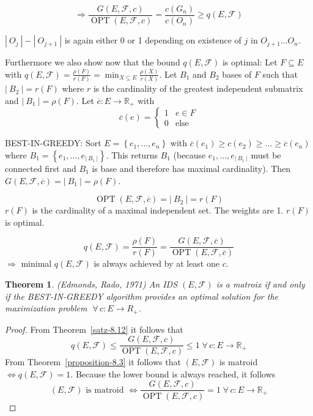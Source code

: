 \documentclass{article}
\newtheorem{theorem}{Theorem}
\newcommand{\card}[1]{\left|\:\!#1\:\!\right|}
\newcommand{\set}[1]{\left\{#1\right\}}
\newcommand{\fall}{\;\forall\,}
\begin{document}
\[
  \Rightarrow
  \frac{G(E, \mathcal{F}, c)}{\operatorname{OPT}(E, \mathcal{F}, c)}
  = \frac{c(G_n)}{c(O_n)}
  \geq q(E, \mathcal{F})
\]

$\card{O_j} - \card{O_{j+1}}$ is again either 0 or 1 depending on existence of $j$ in $O_{j+1} \ldots O_n$.

Furthermore we also show now that the bound $q(E, \mathcal{F})$ is optimal:
Let $F \subseteq E$ with $q(E, \mathcal{F}) = \frac{\rho(F)}{r(F)} = \min_{X \subseteq E} \frac{\rho(X)}{r(X)}$.
Let $B_1$ and $B_2$ bases of $F$ such that $\card{B_2} = r(F)$ where $r$ is the cardinality of the greatest independent submatrix and $\card{B_1} = \rho(F)$.
Let $\overline{c}: E \rightarrow \mathbb{R}_+$ with
\[
  \overline{c}(e) = \begin{cases}
    1 & e \in F \\
    0 & \text{else}
  \end{cases}
\]

BEST-IN-GREEDY: Sort $E = \set{e_1, \ldots, e_n}$ with $\overline{c}(e_1) \geq c(e_2) \geq \ldots \geq \overline{c}(e_n)$ where $B_1 = \set{e_1, \ldots, e_{\card{B_1}}}$. This returns $B_1$ (because $e_1, \ldots, e_{\card{B_1}}$ must be connected first and $B_1$ is base and therefore has maximal cardinality). Then $G(E, \mathcal{F}, \overline{c}) = \card{B_1} = \rho(F)$.

\[ \operatorname{OPT}(E, \mathcal{F}, \overline{c}) = \card{B_2} = r(F) \]
$r(F)$ is the cardinality of a maximal independent set. The weights are 1. $r(F)$ is optimal.

\[ q(E, \mathcal{F}) = \frac{\rho(F)}{r(F)} = \frac{G(E, \mathcal{F}, \overline{c})}{\operatorname{OPT}(E, \mathcal{F}, \overline{c})} \]
$\Rightarrow$ minimal $q(E, \mathcal{F})$ is always achieved by at least one $c$.

\begin{theorem}
  \label{satz-8.13}
  (Edmonds, Rado, 1971)
  An IDS $(E, \mathcal{F})$ is a matroix if and only if the BEST-IN-GREEDY algorithm provides an optimal solution for the maximization problem $\fall c: E \rightarrow{R}_+$.
\end{theorem}

\begin{proof}
  From Theorem~\ref{satz-8.12} it follows that
  \[
      q(E, \mathcal{F})
        \leq \frac{G(E, \mathcal{F}, c)}{\operatorname{OPT}(E, \mathcal{F}, c)}
        \leq 1  \fall c: E \rightarrow \mathbb{R}_+
  \]
  From Theorem~\ref{proposition-8.3} it follows that $(E, \mathcal{F})$ is matroid $\Leftrightarrow q(E, \mathcal{F}) = 1$. Because the lower bound is always reached, it follows
  \[
    (E, \mathcal{F}) \text{ is matroid }
      \Leftrightarrow
    \frac{G(E, \mathcal{F}, c)}{\operatorname{OPT}(E, \mathcal{F}, c)}
    = 1 \fall c: E \rightarrow \mathbb{R}_+
  \]
\end{proof}
\end{document}
